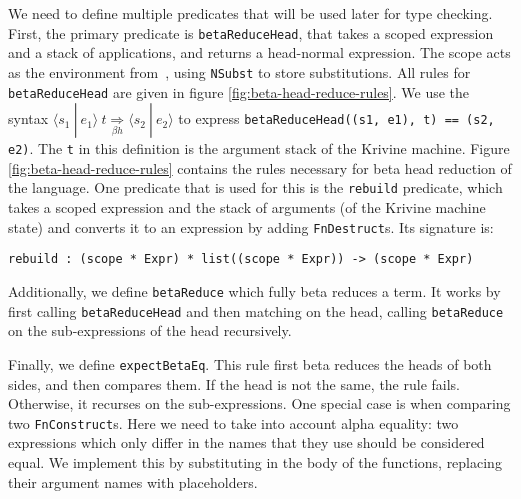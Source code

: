 \documentclass[a4paper,UKenglish,cleveref, autoref, thm-restate]{oasics-v2021}
\newcommand{\scope}[2]{\langle#1 \: | \: #2\rangle}
\newcommand{\bhr}[3]{ #1 \: #2 \underset{\beta h}{\Rightarrow} #3 }
\begin{document}
We need to define multiple predicates that will be used later for type checking. First, the primary predicate is \verb|betaReduceHead|, that takes a scoped expression and a stack of applications, and returns a head-normal expression. The scope acts as the environment from~\cite{krivine}, using \verb|NSubst| to store substitutions. All rules for \verb|betaReduceHead| are given in figure \ref{fig:beta-head-reduce-rules}. We use the syntax $\bhr{\scope{s_1}{e_1}}{t}{\scope{s_2}{e_2}}$ to express \verb|betaReduceHead((s1, e1), t) == (s2, e2)|. The \verb|t| in this definition is the argument stack of the Krivine machine. Figure \ref{fig:beta-head-reduce-rules} contains the rules necessary for beta head reduction of the language. One predicate that is used for this is the \verb|rebuild| predicate, which takes a scoped expression and the stack of arguments (of the Krivine machine state) and converts it to an expression by adding \verb|FnDestruct|s. Its signature is:
\begin{lstlisting}
rebuild : (scope * Expr) * list((scope * Expr)) -> (scope * Expr)
\end{lstlisting}

Additionally, we define \verb|betaReduce| which fully beta reduces a term. It works by first calling \verb|betaReduceHead| and then matching on the head, calling \verb|betaReduce| on the sub-expressions of the head recursively.

Finally, we define \verb|expectBetaEq|. This rule first beta reduces the heads of both sides, and then compares them. If the head is not the same, the rule fails. Otherwise, it recurses on the sub-expressions. One special case is when comparing two \verb|FnConstruct|s. Here we need to take into account alpha equality: two expressions which only differ in the names that they use should be considered equal. We implement this by substituting in the body of the functions, replacing their argument names with placeholders. 
\end{document}
